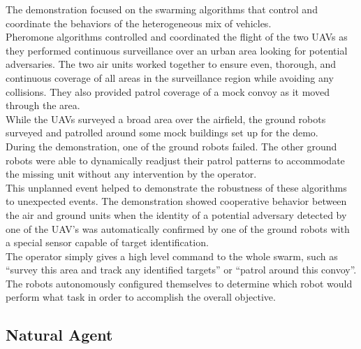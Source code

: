 The demonstration focused on the swarming algorithms that control and coordinate the behaviors of the heterogeneous mix of vehicles.\\
Pheromone  algorithms  controlled  and  coordinated  the  flight  of  the  two  UAVs  as  they  performed continuous  surveillance  over  an  urban  area  looking  for  potential  adversaries. The  two  air  units 
worked together to ensure even, thorough, and continuous coverage of all areas in the surveillance region  while  avoiding  any  collisions. They  also  provided  patrol  coverage  of  a  mock  convoy  as  it moved through the area.\\ 
While the UAVs surveyed a broad area over the airfield, the ground robots surveyed and patrolled around  some  mock  buildings  set  up  for  the  demo.\\
During  the  demonstration,  one  of  the  ground robots  failed. The  other  ground  robots  were  able  to  dynamically  readjust  their  patrol  patterns to accommodate  the  missing  unit  without  any  intervention  by  the  operator.\\
This  unplanned  event helped to demonstrate the robustness of these algorithms to unexpected events. The  demonstration  showed  cooperative  behavior  between  the  air  and  ground  units  when  the identity of a potential adversary detected by one of the UAV’s was automatically confirmed by one of the ground robots with a special sensor capable of target identification.\\
The operator simply gives a high level command to the whole swarm, such as “survey this area and track  any  identified  targets”  or  “patrol  around  this  convoy”.\\
The  robots  autonomously  configured themselves to determine which robot would perform what task in order to accomplish the overall objective.  

\newpage
\subsection{Natural Agent}


